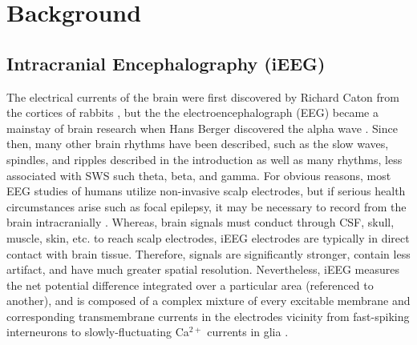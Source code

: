 %
%
\section*{Background}

\subsection*{Intracranial Encephalography (iEEG)}
The electrical currents of the brain were first discovered by Richard Caton from the cortices of rabbits \citep{Caton1875}, but the the electroencephalograph (EEG) became a mainstay of brain research when Hans Berger discovered the alpha wave \citep{Berger1929}. Since then, many other brain rhythms have been described, such as the slow waves, spindles, and ripples described in the introduction as well as many rhythms, less associated with SWS such theta, beta, and gamma. For obvious reasons, most EEG studies of humans utilize non-invasive scalp electrodes, but if serious health circumstances arise such as focal epilepsy, it may be necessary to record from the brain intracranially \citep{Jasper1949}. Whereas, brain signals must conduct through CSF, skull, muscle, skin, etc. to reach scalp electrodes, iEEG electrodes are typically in direct contact with brain tissue. Therefore, signals are significantly stronger, contain less artifact, and have much greater spatial resolution. Nevertheless, iEEG measures the net potential difference integrated over a particular area (referenced to another), and is composed of a complex mixture of every excitable membrane and corresponding transmembrane currents in the electrodes vicinity from fast-spiking interneurons to slowly-fluctuating Ca$^{2+}$ currents in glia \citep{Buzsaki2012}.


